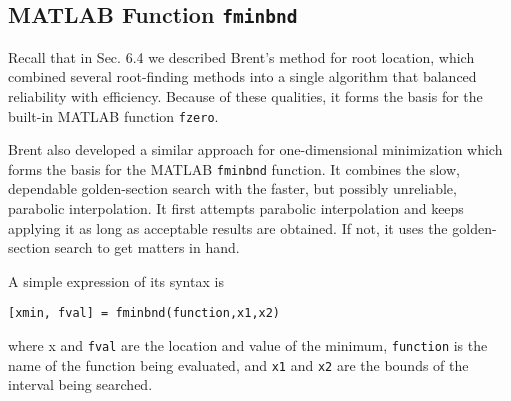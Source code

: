 \documentclass[../main.tex]{subfiles}
\begin{document}

\subsection{MATLAB Function \texttt{fminbnd}}

\noindent Recall that in Sec. 6.4 we described Brent's method for root location, which combined several
root-finding methods into a single algorithm that balanced reliability with efficiency.
Because of these qualities, it forms the basis for the built-in MATLAB function \texttt{fzero}.

Brent also developed a similar approach for one-dimensional minimization which
forms the basis for the MATLAB \texttt{fminbnd} function. It combines the slow, dependable
golden-section search with the faster, but possibly unreliable, parabolic interpolation. It
first attempts parabolic interpolation and keeps applying it as long as acceptable results are
obtained. If not, it uses the golden-section search to get matters in hand.

A simple expression of its syntax is
\smallskip

\texttt{[xmin, fval] = fminbnd(function,x1,x2)}
\smallskip

\noindent where x and \texttt{fval} are the location and value of the minimum, \texttt{function} is the name of the
function being evaluated, and \texttt{x1} and \texttt{x2} are the bounds of the interval being searched.
\newpage
\end{document}
